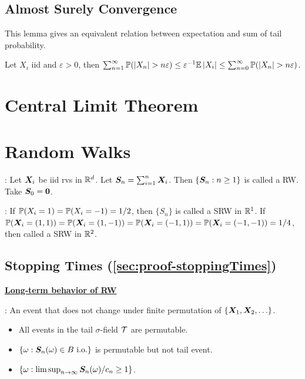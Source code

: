 \documentclass[10pt,a4paper]{article}
\begin{document}
\subsection{Almost Surely Convergence}\label{sec:LLN-AS}

This lemma gives an equivalent relation between expectation and sum of tail probability.
\begin{lemma}\label{lemma:LLN-AS-expectation-sumTail}
	Let $X_i$ iid and $\varepsilon>0$, then $\sum_{n=1}^{\infty } \bbP(\abs{X_n}>n\varepsilon) \leq \varepsilon^{-1}\bbE\abs{X_i} \leq  \sum_{n=0}^\infty \bbP(\abs{X_n}>n\varepsilon)$.  
\end{lemma}


\section{Central Limit Theorem}\label{sec:CLT}

\section{Random Walks}\label{sec:RW}
: Let $\X_i$ be iid rvs in $\bbR^d$. Let $\S_n=\sum_{i=1}^{n}\X_i$. Then $\{\S_n:n\geq 1\}$ is called a RW. Take $\S_0=\0$.  

\noindent {}: If $\bbP(X_i=1)=\bbP(X_i=-1)=1/2$, then $\{S_n\}$ is called a SRW in $\bbR^1$. If $\bbP(\X_i=(1,1))=\bbP(\X_i=(1,-1))=\bbP(\X_i=(-1,1))=\bbP(\X_i=(-1,-1))=1/4$, then called a SRW in $\bbR^2$.

\subsection{Stopping Times (\ref{sec:proof-stoppingTimes})}\label{sec:stoppingTimes}

\noindent \underline{\textbf{Long-term behavior of RW}}

\noindent {}: An event that does not change under finite permutation of $\{\X_1,\X_2,\ldots\}$.
\begin{itemize}
	\item All events in the tail $\sigma$-field $\calT$ are permutable.
	\item $\{\omega:\S_{n}(\omega)\in B \ \mathrm{i.o.}\}$ is permutable but not tail event. 
	\item $\{\omega:\lim\sup_{n\to\infty}\S_{n}(\omega)/c_{n}\geq1\}$.
\end{itemize}
\end{document}
